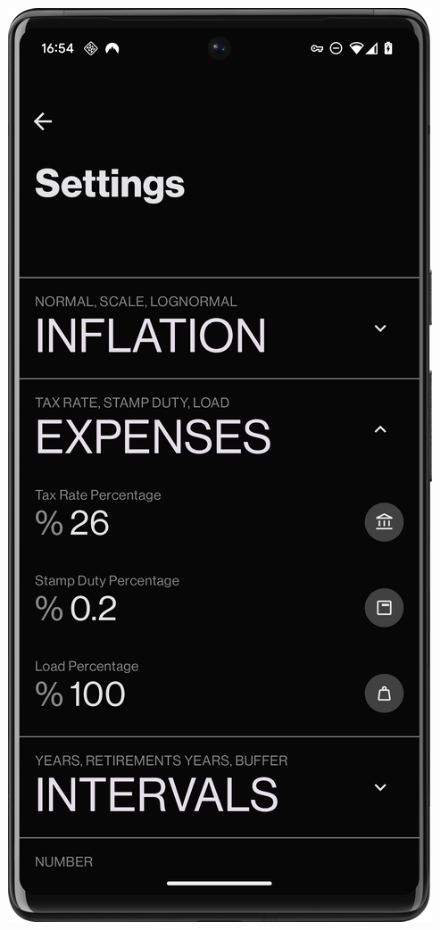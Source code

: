 \begin{figure}[H]
\begin{minipage}{0.24\textwidth}
        \label{fig:inflation_card}
    \end{minipage}
    \hfill
    \begin{minipage}{0.24\textwidth}
        \centering
        \includegraphics[width=\textwidth]{foto/input_card}
        \label{fig:input_card}
    \end{minipage}
\end{figure}